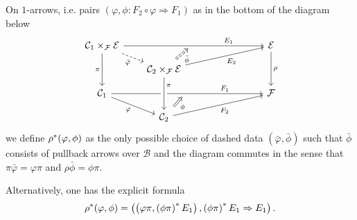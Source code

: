 \documentclass[a4paper,10pt
,draft
]{article}%
\numberwithin{equation}{section}
\numberwithin{figure}{section}
\theoremstyle{definition} %
\newcommand{\1}{\ensuremath{\mathbbm 1}}%
\begin{document}
On $1$-arrows, i.e. pairs 
$(\varphi,\phi \colon F_2 \circ \varphi \Rightarrow F_1)$
as in the bottom of the diagram below
\[
\begin{tikzcd}[column sep = 20pt, row sep = small]
	\mathcal{C}_1 \times_{\mathcal{F}} \mathcal{E} 
	\ar{rrrrr}[name=toE]{}[near end]{E_1} \ar[dashed]{rd}[swap]{\bar{\varphi}} \ar{dd}[swap]{\pi}
	&&&
	&&
	\mathcal{E}  \ar{dd}{\rho}
\\
	&
	|[alias=DBE]|
	\mathcal{C}_2 \times_{\mathcal{F}} \mathcal{E} \ar{rrrru}[swap]{E_2}
\\
	\mathcal{C}_1 \ar{rrrrr}[name=toB]{}[near end]{F_1} \ar{rd}[swap]{\varphi}
	&&&
	&&
	\mathcal{F} 
\\
	&
	|[alias=D]| \mathcal{C}_2 \ar{rrrru}[swap]{F_2}
\arrow[Rightarrow, from=DBE, to=toE, shorten <=0.15cm,shorten >=0.15cm,dashed
,swap,"\bar{\phi}"
]
	\arrow[Rightarrow, from=D, to=toB, shorten <=0.15cm,shorten >=0.15cm,swap,"\phi"]
	\arrow[from=DBE, to=D, crossing over, near start, "\pi"]
\end{tikzcd}
\]
we define $\rho^{\**}(\varphi,\phi)$ as the only possible choice of dashed data
$(\bar{\varphi},\bar{\phi})$
such that $\bar{\phi}$ consists of pullback arrows over $\mathcal{B}$
and the diagram commutes in the sense that
$\pi \bar{\varphi} = \varphi \pi$ and 
$\rho \bar{\phi} = \phi \pi$.


Alternatively, one has the explicit formula
\[
\rho^{\**} (\varphi,\phi)=
\left(
	\left( \varphi \pi,
	\left( \phi \pi \right)^{\**} E_1 \right),
	\left( \phi \pi \right)^{\**} E_1 \Rightarrow E_1
\right).
\]

\end{document}
